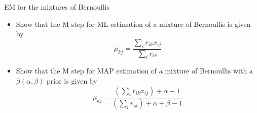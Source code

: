 \documentclass[a4paper,twoside=false,abstract=false,numbers=noenddot,
titlepage=false,headings=small,parskip=half,version=last]{scrartcl}
\begin{document}
\begin{exercise}{11.3} EM for the mixtures of Bernoullis\\ 
    \begin{itemize}
        \item Show that the M step for ML estimation of a mixture of Bernoullis
            is given by
            \begin{equation}
                \mu_{kj} = 
                \frac
                {
                    \sum_i{
                        r_{ik}x_{ij}
                    }
                }
                {
                \sum_i{
                    r_{ik}
                }
            } 
            \end{equation}
        \item Show that the M step for MAP estimation of a mixture of
        Bernoullis with a $\beta(\alpha,\beta)$ prior is given by
            \begin{equation}
                \mu_{kj} = 
                \frac
                {
                    (\sum_i{
                        r_{ik}x_{ij}
                    }) + \alpha - 1
                }
                {
                    (\sum_i{
                        r_{ik}
                    }) + \alpha + \beta - 1
                }
            \end{equation}
    \end{itemize}
\end{exercise}
\end{document}

